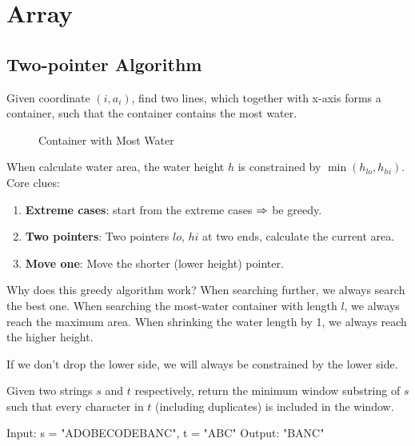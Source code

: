 \chapter{Array}
\section{Two-pointer Algorithm}
 Given coordinate $(i, a_i)$, find two lines, which together with x-axis forms a container, such that the container contains the most water.
\begin{figure}[hbtp]
\centering
{}
\caption{Container with Most Water}
\label{fig:Container-With-Most-Water}
\end{figure}

When calculate water area, the water height $h$ is constrained by $\min(h_{lo}, h_{hi})$. Core clues:
\begin{enumerate}
\item \textbf{Extreme cases}: start from the extreme cases $\Rightarrow$ be greedy.
\item \textbf{Two pointers}: Two pointers $lo$, $hi$ at two ends, calculate the current area.
\item \textbf{Move one}: Move the shorter (lower height) pointer. 
\end{enumerate}

Why does this greedy algorithm work? When searching further, we always search the best one.  When searching the most-water container with length $l$, we always reach the maximum area. When shrinking the water length by 1, we always reach the higher height. 

If we don't drop the lower side, we will always be constrained by the lower side. 

 Given two strings $s$ and $t$ respectively, return the minimum window substring of $s$ such that every character in $t$ (including duplicates) is included in the window.
\begin{python}
Input: s = "ADOBECODEBANC", t = "ABC"
Output: "BANC"
\end{python}

